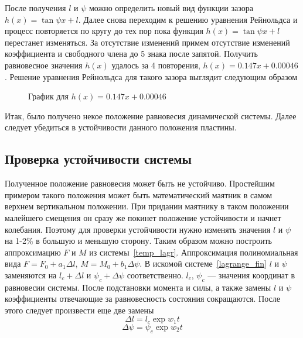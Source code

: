 \documentclass[a4paper,14pt]{extarticle}
\begin{document}
После получения  $l$ и $\psi$ можно определить новый вид функции зазора $h(x) = \tan{\psi} x + l$. Далее снова переходим к решению уравнения Рейнольдса и процесс повторяется по кругу до тех пор пока функция  $h(x) = \tan{\psi} x + l$ перестанет изменяться.
За отсутствие изменений примем отсутствие изменений коэффициента и свободного члена до 5 знака после запятой. 
Получить равновесное значения $h(x)$ удалось за 4 повторения, $h(x) = 0.147 x + 0.00046$. 
Решение уравнения Рейнольдса для такого зазора выглядит следующим образом
\begin{figure}[!htbp]
	\caption{График для $h(x) = 0.147 x + 0.00046$}
	\label{part_2-zazor}
\end{figure}

\noindent Итак, было получено некое положение равновесия динамической системы. Далее следует убедиться в устойчивости данного положения пластины.


\subsection{Проверка устойчивости системы}
Полученное положение равновесия может быть не устойчиво. Простейшим примером такого положения может быть математический маятник в самом верхнем вертикальном положении. При придании маятнику в таком положении малейшего смещения он сразу же покинет положение устойчивости и начнет колебания. Поэтому для проверки устойчивости нужно изменять значения $l$ и $\psi$ на 1-2\% в большую и меньшую сторону.  Таким образом  можно построить аппроксимацию $F$ и $M$ из системы~\eqref{temp_lagr}. Аппроксимация полиномиальная вида $F = F_0 + a_1 \Delta{l}$, $M = M_0 + b_1 \Delta{\psi}$.
В искомой системе~\eqref{lagrange_fin} $l$ и $\psi$ заменяются на $l_c + \Delta{l}$ и $\psi_c + \Delta{\psi}$ соответственно. $l_c$, $\psi_c$ --- значения координат в равновесии системы. После подстановки момента и силы, а также замены $l$ и $\psi$ коэффициенты отвечающие за равновесность состояния сокращаются. После этого следует произвести еще две замены
\begin{equation*}
	\Delta{l} = l_c \exp{w_1 t}
\end{equation*}
\begin{equation*}
	\Delta{\psi} = \psi_c \exp{w_2 t}
\end{equation*}
\end{document}
